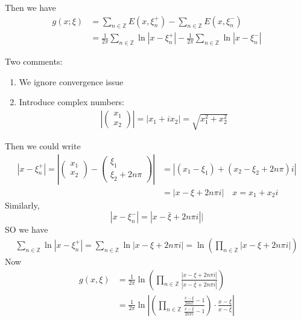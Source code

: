 \documentclass{article}
\begin{document}
Then we have 
\begin{align}
	g(x;\xi) &= \sum_{n \in \mathbb{Z}} E(x, \xi_n^+) - \sum_{n \in \mathbb{Z}} E(x, \xi_n^-) \\
	&= \frac{1}{2 \pi} \sum_{n \in \mathbb{Z}} \ln |x- \xi_n^+| -\frac{1}{2 \pi} \sum_{n \in \mathbb{Z}} \ln |x- \xi_n^-| 
\end{align}
\begin{tcolorbox}[colback=blue!20!white]
Two comments:
\begin{enumerate}
	\item We ignore convergence issue
	\item Introduce complex numbers:
	\begin{align}
	\left|\begin{pmatrix}
			x_1 \\ x_2
		\end{pmatrix}\right| = |x_1+ ix_2| = \sqrt{x_1^2+x_2^2}
	\end{align}
\end{enumerate}
\end{tcolorbox}
Then we could write 
\begin{align*}
	|x- \xi_n^+| = \left| \begin{pmatrix}
		x_1 \\ x_2
	\end{pmatrix} - \begin{pmatrix}
		\xi_1 \\ \xi_2 + 2n \pi
	\end{pmatrix}\right| 
	& = |(x_1 -\xi_1) + (x_2- \xi_2 + 2 n \pi)i| \\
	& = |x - \xi + 2 n \pi i| \quad x = x_1 + x_2 i
\end{align*}
Similarly,
\[
	|x - \xi_n^-| = |x - \bar{\xi} + 2n \pi i ||
\]
SO we have 
\begin{align}
	\sum_{n \in \mathbb{Z}} \ln |x - \xi_n^+| = \sum_{n \in \mathbb{Z}} \ln |x - \xi+ 2n \pi i| = \ln \left( \prod _{n \in \mathbb{Z} } |x- \xi + 2n \pi i|\right)
\end{align}
Now 
\begin{align}
	g(x , \xi) & = \frac{1}{ 2 \pi} \ln \left( \prod _{n \in \mathbb{Z} }  \frac{|x- \xi + 2n \pi i|}{ |x- \bar{ \xi}+ 2n \pi i|}\right) \\
	&= \frac{1}{2 \pi} \ln \left| \left(\prod _{n \in \mathbb{Z} } \frac{\frac{x -\xi}{2 i n \pi}-1 }{\frac{x - \bar{\xi}}{2 n \pi i}-1}\right) \cdot \frac{x - \xi}{x - \bar\xi} \right|
\end{align}
\end{document}
